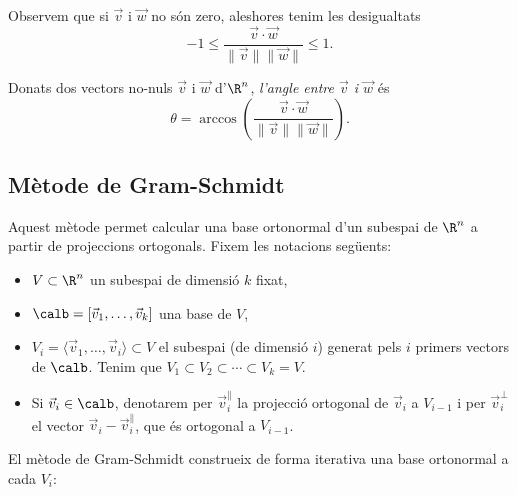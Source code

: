 Observem que si $\vec v$ i $\vec w$ no són zero, aleshores tenim les desigualtats
\[
-1 \leq \frac{\vec v\cdot \vec w}{\|\vec v\|\|\vec w\|}\leq 1.
\]
\begin{definicio}
Donats dos vectors no-nuls $\vec v$ i $\vec w$ d'$\R^n$, \emph{l'angle entre $\vec v$ i $\vec w$} és
\[
\theta = \arccos\left(\frac{\vec v\cdot \vec w}{\|\vec v\|\|\vec w\|}\right).
\]
\end{definicio}

\subsection{Mètode de Gram-Schmidt}
Aquest mètode permet calcular una base ortonormal d'un subespai de $\R^n$ a partir de projeccions ortogonals. Fixem les notacions següents:
\begin{itemize}
    \item $V\subset \R^n$ un subespai de dimensió $k$ fixat,
    \item $\calb =[\vec v_1, \dots , \vec v_k]$ una base de $V$,
    \item $V_i=\langle \vec v_1, \dots , \vec v_i\rangle \subset V$ el subespai (de dimensió $i$) generat pels $i$ primers vectors de $\calb$. Tenim que $V_1\subset V_2\subset \cdots \subset V_k=V$.
    \item Si $\vec v_i\in\calb$, denotarem per $\vec v_i^\parallel$ la projecció ortogonal de $\vec v_i$ a $V_{i-1}$ i per $\vec v_i^\perp$ el vector  $\vec v_i - \vec v_i^\parallel$, que és ortogonal a $V_{i-1}$.
\end{itemize}
El mètode de Gram-Schmidt construeix de forma iterativa una base ortonormal a cada $V_i$:
